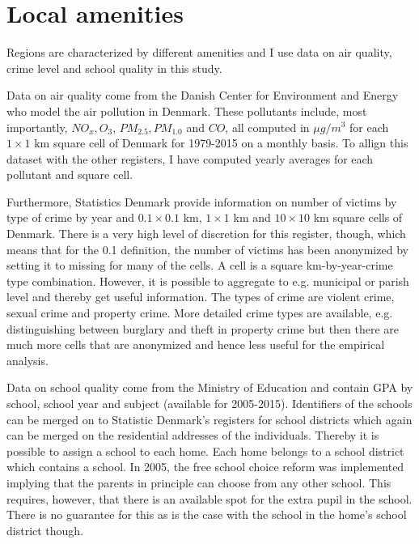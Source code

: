 \section{Local amenities}
Regions are characterized by different amenities and I use data on air quality, crime level and school quality in this study. 

Data on air quality come from the Danish Center for Environment and Energy who model the air pollution in Denmark. These pollutants include, most importantly, $NO_x,O_3$, $PM_{2.5},PM_{1.0}$ and $CO$, all computed in $\mu g/m^3$ for each $1\times 1$ km square cell of Denmark for 1979-2015 on a monthly basis. To allign this dataset with the other registers, I have computed yearly averages for each pollutant and square cell. 

Furthermore, Statistics Denmark provide information on number of victims by type of crime by year and $0.1\times 0.1$ km, $1\times 1$ km and $10\times 10$ km square cells of Denmark. There is a very high level of discretion for this register, though, which means that for the 0.1 definition, the number of victims has been anonymized by setting it to missing for many of the cells. A cell is a square km-by-year-crime type combination. However, it is possible to aggregate to e.g. municipal or parish level and thereby get useful information. The types of crime are violent crime, sexual crime and property crime. More detailed crime types are available, e.g. distinguishing between burglary and theft in property crime but then there are much more cells that are anonymized and hence less useful for the empirical analysis.

Data on school quality come from the Ministry of Education and contain GPA by school, school year and subject (available for 2005-2015). Identifiers of the schools can be merged on to Statistic Denmark's registers for school districts which again can be merged on the residential addresses of the individuals. Thereby it is possible to assign a school to each home. Each home belongs to a school district which contains a school. In 2005, the free school choice reform was implemented implying that the parents in principle can choose from any other school. This requires, however, that there is an available spot for the extra pupil in the school. There is no guarantee for this as is the case with the school in the home's school district though.
